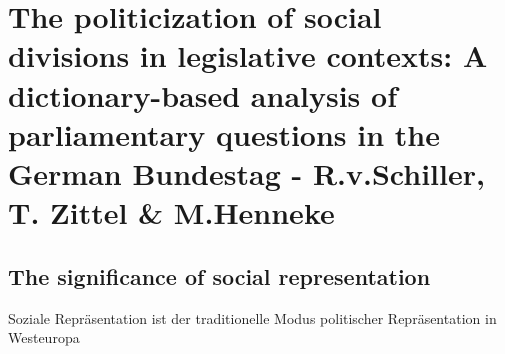 \documentclass[11pt]{article}
\date{\today}
\title{}
\begin{document}
\tableofcontents

\section{The politicization of social divisions in legislative contexts: A dictionary-based analysis of parliamentary questions in the German Bundestag - R.v.Schiller, T. Zittel \& M.Henneke}
\label{sec:org0b8dc6d}

\subsection{The significance of social representation}
\label{sec:org5d42b68}

Soziale Repräsentation ist der traditionelle Modus politischer Repräsentation in Westeuropa 
\end{document}
